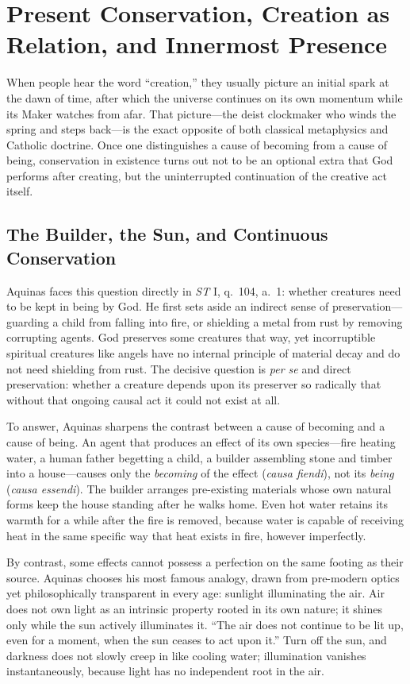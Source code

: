 \section{Present Conservation, Creation as Relation, and Innermost Presence}

When people hear the word ``creation,'' they usually picture an initial spark at the dawn of time, after which the universe continues on its own momentum while its Maker watches from afar. That picture---the deist clockmaker who winds the spring and steps back---is the exact opposite of both classical metaphysics and Catholic doctrine. Once one distinguishes a cause of becoming from a cause of being, conservation in existence turns out not to be an optional extra that God performs after creating, but the uninterrupted continuation of the creative act itself.

\subsection{The Builder, the Sun, and Continuous Conservation}

Aquinas faces this question directly in \emph{ST} I, q.\ 104, a.\ 1: whether creatures need to be kept in being by God. He first sets aside an indirect sense of preservation---guarding a child from falling into fire, or shielding a metal from rust by removing corrupting agents. God preserves some creatures that way, yet incorruptible spiritual creatures like angels have no internal principle of material decay and do not need shielding from rust. The decisive question is \emph{per se} and direct preservation: whether a creature depends upon its preserver so radically that without that ongoing causal act it could not exist at all.

To answer, Aquinas sharpens the contrast between a cause of becoming and a cause of being. An agent that produces an effect of its own species---fire heating water, a human father begetting a child, a builder assembling stone and timber into a house---causes only the \emph{becoming} of the effect (\emph{causa fiendi}), not its \emph{being} (\emph{causa essendi}). The builder arranges pre-existing materials whose own natural forms keep the house standing after he walks home. Even hot water retains its warmth for a while after the fire is removed, because water is capable of receiving heat in the same specific way that heat exists in fire, however imperfectly.

By contrast, some effects cannot possess a perfection on the same footing as their source. Aquinas chooses his most famous analogy, drawn from pre-modern optics yet philosophically transparent in every age: sunlight illuminating the air. Air does not own light as an intrinsic property rooted in its own nature; it shines only while the sun actively illuminates it. ``The air does not continue to be lit up, even for a moment, when the sun ceases to act upon it.'' Turn off the sun, and darkness does not slowly creep in like cooling water; illumination vanishes instantaneously, because light has no independent root in the air.

